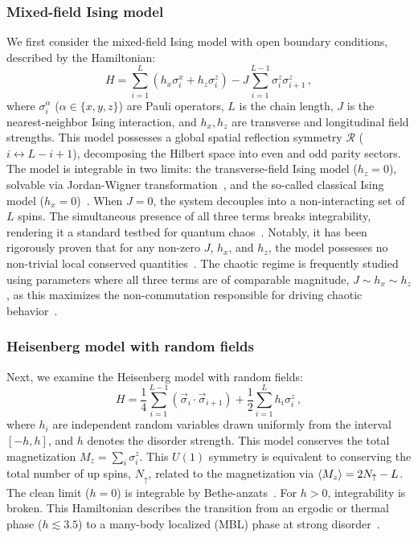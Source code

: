 \documentclass[pra,twocolumn,aps,showpacs,superscriptaddress,longbibliography]{revtex4-2}%
\begin{document}
\subsubsection{Mixed-field Ising model}\label{sec:ising}
We first consider the mixed-field Ising model with open boundary conditions, described by the Hamiltonian:
\begin{equation}\label{eq:H:ising}
H = \sum_{i=1}^L \left( h_x \sigma_i^x + h_z \sigma_i^z \right) - J \sum_{i=1}^{L-1} \sigma_i^z \sigma_{i+1}^z \, ,
\end{equation}
where $\sigma_i^\alpha$ ($\alpha \in \{x,y,z\}$) are Pauli operators, $L$ is the chain length, $J$ is the nearest-neighbor Ising interaction, and $h_x, h_z$ are transverse and longitudinal field strengths. This model possesses a global spatial reflection symmetry $\mathcal{R}$ ($i \leftrightarrow L-i+1$), decomposing the Hilbert space into even and odd parity sectors. The model is integrable in two limits: the transverse-field Ising model ($h_z = 0$), solvable via Jordan-Wigner transformation~\cite{sachdev_2011_quantum}, and the so-called classical Ising model ($h_x = 0$)~\cite{baxter_2007_exactly}. When $J=0$, the system decouples into a non-interacting set of $L$ spins. The simultaneous presence of all three terms breaks integrability, rendering it a standard testbed for quantum chaos~\cite{kim_2014_testing,garrison_2018_does,borgonovi_2016_quantum}. Notably, it has been rigorously proven that for any non-zero $J$, $h_x$, and $h_z$, the model possesses no non-trivial local conserved quantities~\cite{chiba_2024_proof}. The chaotic regime is frequently studied using parameters where all three terms are of comparable magnitude, $J \sim h_x \sim h_z$, as this maximizes the non-commutation responsible for driving chaotic behavior~\cite{karthik_2007_entanglement,atas_2017_quantum,camargo_2024_spread}.


\subsubsection{Heisenberg model with random fields}\label{sec:heisenberg}
Next, we examine the Heisenberg model with random fields:
\begin{equation}\label{eq:H:heisenberg}
H = \frac{1}{4}\sum_{i=1}^{L-1} \left(\vec{\sigma}_i \cdot \vec{\sigma}_{i+1}\right) + \frac{1}{2}\sum_{i=1}^L h_i \sigma_i^z \, ,
\end{equation}
where $h_i$ are independent random variables drawn uniformly from the interval $[-h, h]$, and $h$ denotes the disorder strength. This model conserves the total magnetization $M_z = \sum_i \sigma_i^z$. This $U(1)$ symmetry is equivalent to conserving the total number of up spins, $N_{\uparrow}$, related to the magnetization via $\ev{M_z} = 2N_{\uparrow} - L$. The clean limit ($h=0$) is integrable by Bethe-anzats~\cite{bethe_1931_zur}. For $h>0$, integrability is broken. This Hamiltonian describes the transition from an ergodic or thermal phase ($h \lesssim 3.5$) to a many-body localized (MBL) phase at strong disorder~\cite{oganesyan_2007_localization,luitz_2015_manybody,abanin_2019_colloquium}.
\end{document}
